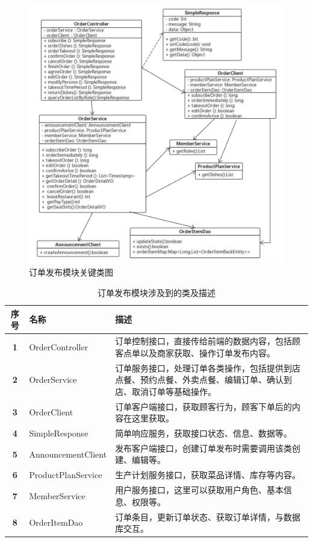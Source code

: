 \begin{figure}[htbp!]
    \centering
    \includegraphics[width=5.2in]{FIGs/chapter4/order.pdf}
    \caption{订单发布模块关键类图}\label{fig_order}
\end{figure}

\begin{table}[htbp!]\footnotesize
    \centering
    \caption{订单发布模块涉及到的类及描述}
    \vspace{2mm}
    \begin{tabular}{clp{}}
    \toprule
    \textbf{序号}&\textbf{名称}&\textbf{描述}\\
    \midrule 
    \textbf{1}& OrderController& 订单控制接口，直接传给前端的数据内容，包括顾客点单以及商家获取、操作订单发布内容。\\
    \hline
    \textbf{2}& OrderService& 订单服务接口，处理订单各类操作，包括提供到店点餐、预约点餐、外卖点餐、编辑订单、确认到店、取消订单等基础操作。\\
    \hline
    \textbf{3}& OrderClient& 订单客户端接口，获取顾客行为，顾客下单后的内容在这里获取。\\
    \hline
    \textbf{4}& SimpleResponse& 简单响应服务，获取接口状态、信息、数据等。\\
    \hline
    \textbf{5}& AnnouncementClient& 发布客户端接口，创建订单发布时需要调用该类创建、编辑等。\\
    \hline
    \textbf{6}& ProductPlanService& 生产计划服务接口，获取菜品详情、库存等内容。\\
    \hline
    \textbf{7}& MemberService& 用户服务接口，这里可以获取用户角色、基本信息、权限等。\\
    \hline
    \textbf{8}& OrderItemDao& 订单条目，更新订单状态、获取订单详情，与数据库交互。\\
    \bottomrule
    \end{tabular}
    \label{table:1List}
\end{table}


